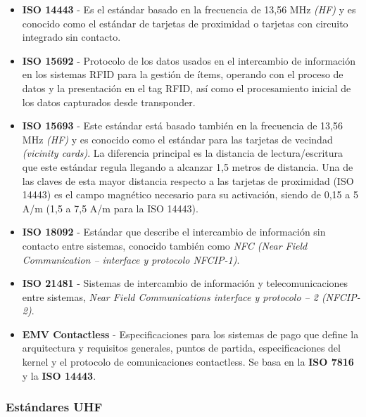\begin{itemize}
\item \textbf{ISO 14443} - Es el estándar basado en la frecuencia de 13,56 MHz \textit{(HF)} y es conocido como el estándar de tarjetas de proximidad o tarjetas con circuito integrado sin contacto.
\item \textbf{ISO 15692} - Protocolo de los datos usados en el intercambio de información en los sistemas RFID para la gestión de ítems, operando con el proceso de datos y la presentación en el tag RFID, así como el procesamiento inicial de los datos capturados desde transponder.
\item \textbf{ISO 15693} - Este estándar está basado también en la frecuencia de 13,56 MHz \textit{(HF)} y es conocido como el estándar para las tarjetas de vecindad \textit{(vicinity cards)}. La diferencia principal es la distancia de lectura/escritura que este estándar regula llegando a alcanzar 1,5 metros de distancia. Una de las claves de esta mayor distancia respecto a las tarjetas de proximidad (ISO 14443) es el campo magnético necesario para su activación, siendo de 0,15 a 5 A/m (1,5 a 7,5 A/m para la ISO 14443).
\item \textbf{ISO 18092} - Estándar que describe el intercambio de información sin contacto entre sistemas, conocido también como \textit{NFC (Near Field Communication – interface y protocolo NFCIP-1)}.
\item \textbf{ISO 21481} - Sistemas de intercambio de información y telecomunicaciones entre sistemas, \textit{Near Field Communications interface y protocolo – 2 (NFCIP-2)}.
\item \textbf{EMV Contactless} - Especificaciones para los sistemas de pago que define la arquitectura y requisitos generales, puntos de partida, especificaciones del kernel y el protocolo de comunicaciones contactless. Se basa en la \textbf{ISO 7816} y la \textbf{ISO 14443}.
\end{itemize}

\subsubsection{Estándares UHF}

